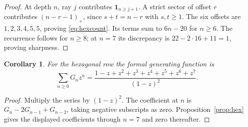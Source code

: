 \documentclass[11pt]{article}
\newtheorem{corollary}[theorem]{Corollary}
\begin{document}
\begin{proof}
At depth $n$, ray $j$ contributes $\mathbf1_{n\geq j+1}$.
A strict sector of offset $r$ contributes $(n-r-1)_+$, since
$s+t=n-r$ with $s,t\geq1$. The six offsets are $1,2,3,4,5,5$,
proving \eqref{eq:hexcount}. Its terms sum to $6n-20$ for $n\geq6$.
The recurrence follows for $n\geq8$; at $n=7$ its discrepancy is
$22-2\cdot16+11=1$, proving sharpness.
\end{proof}

\begin{corollary}
For the hexagonal row the formal generating function is
\[
 \sum_{n\geq0}G_nz^n=
 \frac{1-z+z^2+z^3+z^4+z^5+z^6+z^7}{(1-z)^2}.
\]
\end{corollary}
\begin{proof}
Multiply the series by $(1-z)^2$. The coefficient at $n$ is
$G_n-2G_{n-1}+G_{n-2}$, taking negative subscripts as zero.
Proposition~\ref{prop:hex} gives the displayed coefficients through
$n=7$ and zero thereafter.
\end{proof}
\end{document}
